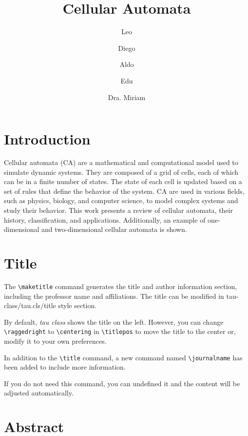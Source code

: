 \documentclass[9pt,a4paper,twoside]{tau-class/tau}
\title{Cellular Automata}
\author[a,1]{Leo}
\author[a,2]{Diego}
\author[a,3]{Aldo}
\author[a,4]{Edu}
\author[b,5]{Dra. Miriam}
\affil[a]{Estudiante}
\affil[b]{Tutora}
\begin{document}
		
    \maketitle 
    \thispagestyle{firststyle} \tauabstract 
    \tableofcontents
    \linenumbers 

\section{Introduction}

    Cellular automata (CA) are a mathematical and computational model used to simulate dynamic systems. 
        They are composed of a grid of cells, each of which can be in a finite number of states. 
        The state of each cell is updated based on a set of rules that define the behavior of the system. 
        CA are used in various fields, such as physics, biology, and computer science, to model complex systems and study their behavior. 
        This work presents a review of cellular automata, their history, classification, and applications. 
        Additionally, an example of one-dimensional and two-dimensional cellular automata is shown.
   
\section{Title}

    The \verb*|\maketitle| command generates the title and author information section, including the professor name and affiliations. The title can be modified in tau-class/tau.cls/title style section. 
	
    By default, \textit{tau class} shows the title on the left. However, you can change \verb*|\raggedright| to \verb*|\centering| in \verb*|\titlepos| to move the title to the center or, modify it to your own preferences.
	
    In addition to the \verb|\title| command, a new command named \verb|\journalname| has been added to include more information. 
	
    If you do not need this command, you can undefined it and the content will be adjusted automatically.
	
\section{Abstract}
\end{document}
